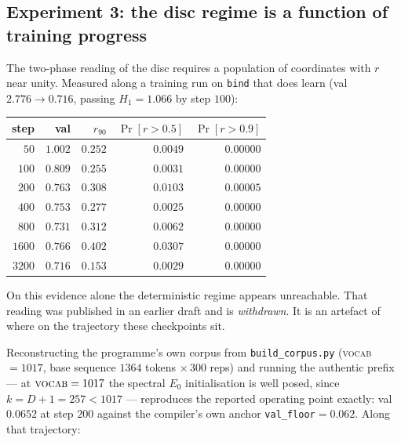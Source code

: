 \subsection{Experiment 3: the disc regime is a function of training progress}
\label{sec:regime-negative}

The two-phase reading of the disc requires a population of coordinates with
$r$ near unity. Measured along a training run on \texttt{bind} that does learn
(val $2.776\to0.716$, passing $H_1=1.066$ by step $100$):

\begin{center}
\begin{tabular}{rrrrr}
\hline
step & val & $r_{90}$ & $\Pr[r>0.5]$ & $\Pr[r>0.9]$ \\
\hline
$50$   & $1.002$ & $0.252$ & $0.0049$ & $0.00000$ \\
$100$  & $0.809$ & $0.255$ & $0.0031$ & $0.00000$ \\
$200$  & $0.763$ & $0.308$ & $0.0103$ & $0.00005$ \\
$400$  & $0.753$ & $0.277$ & $0.0025$ & $0.00000$ \\
$800$  & $0.731$ & $0.312$ & $0.0062$ & $0.00000$ \\
$1600$ & $0.766$ & $0.402$ & $0.0307$ & $0.00000$ \\
$3200$ & $0.716$ & $0.153$ & $0.0029$ & $0.00000$ \\
\hline
\end{tabular}
\end{center}

On this evidence alone the deterministic regime appears unreachable. That
reading was published in an earlier draft and is \emph{withdrawn}. It is an
artefact of where on the trajectory these checkpoints sit.

Reconstructing the programme's own corpus from \texttt{build\_corpus.py}
(\textsc{vocab} $=1017$, base sequence $1364$ tokens $\times\,300$ reps) and
running the authentic prefix --- at $\textsc{vocab}=1017$ the spectral $E_0$
initialisation is well posed, since $k=D{+}1=257<1017$ --- reproduces the
reported operating point exactly: val $0.0652$ at step $200$ against the
compiler's own anchor \texttt{val\_floor}$=0.062$. Along that trajectory:

